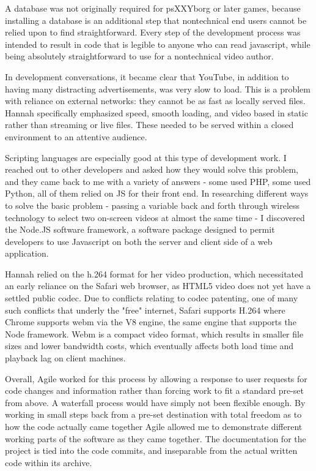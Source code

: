 A database was not originally required for psXXYborg or later games, because installing a database is an additional step that nontechnical end users cannot be relied upon to find straightforward. Every step of the development process was intended to result in code that is legible to anyone who can read javascript, while being absolutely straightforward to use for a nontechnical video author. 

In development conversations, it became clear that YouTube, in addition to having many distracting advertisements, was very slow to load. This is a problem with reliance on external networks: they cannot be as fast as locally served files. Hannah specifically emphasized speed, smooth loading, and video based in static rather than streaming or live files. These needed to be served within a closed environment to an attentive audience. 

Scripting languages are especially good at this type of development work. I reached out to other developers and asked how they would solve this problem, and they came back to me with a variety of answers - some used PHP, some used Python, all of them relied on JS for their front end. In researching different ways to solve the basic problem - passing a variable back and forth through wireless technology to select two on-screen videos at almost the same time - I discovered the Node.JS software framework, a software package designed to permit developers to use Javascript on both the server and client side of a web application. 

Hannah relied on the h.264 format for her video production, which necessitated an early reliance on the Safari web browser, as HTML5 video does not yet have a settled public codec. Due to conflicts relating to codec patenting, one of many such conflicts that underly the "free" internet, Safari supports H.264 where Chrome supports webm via the V8 engine, the same engine that supports the Node framework. Webm is a compact video format, which results in smaller file sizes and lower bandwidth costs, which eventually affects both load time and playback lag on client machines. 

Overall, Agile worked for this process by allowing a response to user requests for code changes and information rather than forcing work to fit a standard pre-set from above. A waterfall process would have simply not been flexible enough. By working in small steps back from a pre-set destination with total freedom as to how the code actually came together Agile allowed me to demonstrate different working parts of the software as they came together. The documentation for the project is tied into the code commits, and inseparable from the actual written code within its archive.

